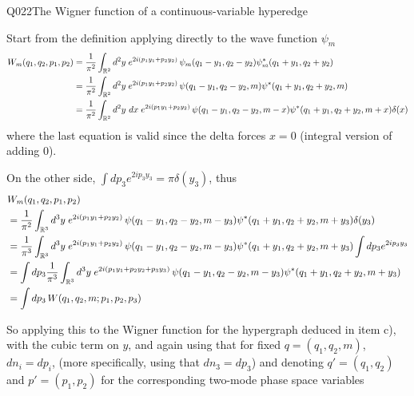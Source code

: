 \begin{entry}{Q022}{The Wigner function of a continuous-variable hyperedge}
\begin{solution}[Part (e)]
Start from the definition applying directly to the wave function $\psi_m$
\begin{equation}
\begin{split}
    W_m(q_1,q_2,p_1,p_2) &= \frac{1}{\pi^{2}}\int_{\RR^{2}}d^{2}y\;e^{2i(p_1y_1+p_2y_2)}\,
  \psi_m(q_1-y_1,q_2-y_2)\psi^*_m(q_1+y_1,q_2+y_2) \\
  &= \frac{1}{\pi^{2}}\int_{\RR^{2}}d^{2}y\;e^{2i(p_1y_1+p_2y_2)}\,
  \psi(q_1-y_1,q_2-y_2,m)\psi^*(q_1+y_1,q_2+y_2,m) \\
  &= \frac{1}{\pi^{2}}\int_{\RR^{2}}d^{2}y\ dx\;e^{2i(p_1y_1+p_2y_2)}\,
  \psi(q_1-y_1,q_2-y_2,m-x)\psi^*(q_1+y_1,q_2+y_2,m+x)\delta(x)
\end{split} 
\end{equation}
where the last equation is valid since the delta forces $x=0$ (integral version of adding 0).

On the other side, $\int dp_3 e^{2ip_3y_3}=\pi\delta(y_3)$, thus
\hspace{-2cm}
\begin{equation}
\begin{split}
    &W_m(q_1,q_2,p_1,p_2) \\
    &= \frac{1}{\pi^{2}}\int_{\mathbb{R}^{3}}d^{3}y\;e^{2i(p_1y_1+p_2y_2)}\,
  \psi(q_1-y_1,q_2-y_2,m-y_3)\psi^*(q_1+y_1,q_2+y_2,m+y_3)\delta(y_3)\\
  &= \frac{1}{\pi^{3}}\int_{\mathbb{R}^{3}}d^{3}y\;e^{2i(p_1y_1+p_2y_2)}\,
  \psi(q_1-y_1,q_2-y_2,m-y_3)\psi^*(q_1+y_1,q_2+y_2,m+y_3)\int dp_3 e^{2ip_3y_3}\\
  &= \int dp_3 \frac{1}{\pi^{3}}\int_{\mathbb{R}^{3}}d^{3}y\;e^{2i(p_1y_1+p_2y_2+p_3y_3)}\,
  \psi(q_1-y_1,q_2-y_2,m-y_3)\psi^*(q_1+y_1,q_2+y_2,m+y_3)\\
  &= \int dp_3\,W(q_1,q_2,m;p_1,p_2,p_3) 
\end{split} 
\end{equation}

So applying this to the Wigner function for the hypergraph deduced in item c), with the cubic term on $y$, and again using that for fixed $q=(q_1,q_2,m)$, $dn_i=dp_i$, (more specifically, using that $dn_3=dp_3$) and denoting $q'=(q_1,q_2)$ and $p'=(p_1,p_2)$ for the corresponding two-mode phase space variables


\end{solution}
\end{entry}
